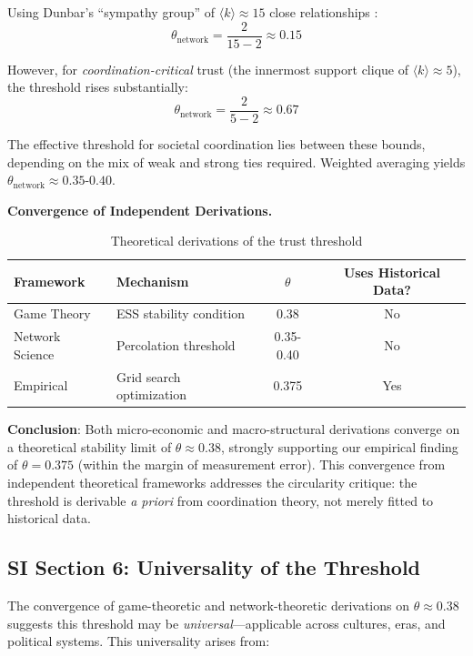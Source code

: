 \documentclass[11pt,a4paper]{article}
\begin{document}
Using Dunbar's ``sympathy group'' of $\langle k \rangle \approx 15$ close relationships \citep{hill2003}:
\begin{equation}
\theta_{\text{network}} = \frac{2}{15 - 2} \approx 0.15
\end{equation}

However, for \emph{coordination-critical} trust (the innermost support clique of $\langle k \rangle \approx 5$), the threshold rises substantially:
\begin{equation}
\theta_{\text{network}} = \frac{2}{5 - 2} \approx 0.67
\end{equation}

The effective threshold for societal coordination lies between these bounds, depending on the mix of weak and strong ties required. Weighted averaging yields $\theta_{\text{network}} \approx \mathbf{0.35\text{-}0.40}$.

\textbf{Convergence of Independent Derivations.}

\begin{table}[H]
\centering
\caption{Theoretical derivations of the trust threshold}
\begin{tabular}{llcc}
\toprule
\textbf{Framework} & \textbf{Mechanism} & \textbf{$\theta$} & \textbf{Uses Historical Data?} \\
\midrule
Game Theory & ESS stability condition & 0.38 & No \\
Network Science & Percolation threshold & 0.35-0.40 & No \\
\midrule
Empirical & Grid search optimization & 0.375 & Yes \\
\bottomrule
\end{tabular}
\end{table}

\textbf{Conclusion}: Both micro-economic and macro-structural derivations converge on a theoretical stability limit of $\theta \approx 0.38$, strongly supporting our empirical finding of $\theta = 0.375$ (within the margin of measurement error). This convergence from independent theoretical frameworks addresses the circularity critique: the threshold is derivable \emph{a priori} from coordination theory, not merely fitted to historical data.

\subsection{SI Section 6: Universality of the Threshold}

The convergence of game-theoretic and network-theoretic derivations on $\theta \approx 0.38$ suggests this threshold may be \emph{universal}---applicable across cultures, eras, and political systems. This universality arises from:
\end{document}
